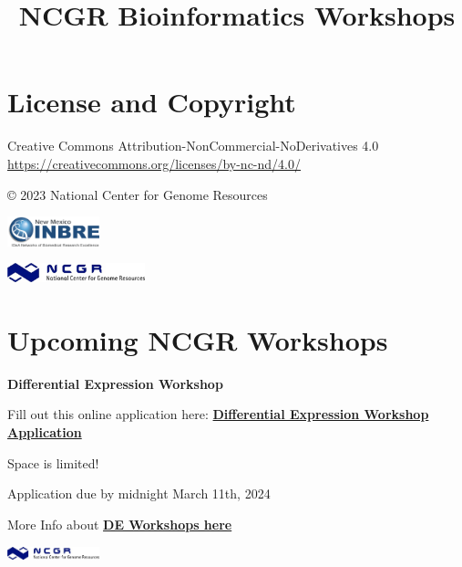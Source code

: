 \documentclass[
]{book}
\title{NCGR Bioinformatics Workshops}
\author{}
\date{\vspace{-2.5em}}
\begin{document}
\maketitle

{
\setcounter{tocdepth}{1}
\tableofcontents
}
\hypertarget{license-and-copyright}{%
\chapter*{License and Copyright}\label{license-and-copyright}}

Creative Commons Attribution-NonCommercial-NoDerivatives 4.0
\url{https://creativecommons.org/licenses/by-nc-nd/4.0/}

© 2023 National Center for Genome Resources

\includegraphics[width=0.2\textwidth,height=\textheight]{./Figures/INBRE_Logo_Grad_transparent-2019.png}

\includegraphics[width=0.3\textwidth,height=\textheight]{./Figures/ncgr.png}

\hypertarget{upcoming-ncgr-workshops}{%
\chapter*{Upcoming NCGR Workshops}\label{upcoming-ncgr-workshops}}

\textbf{Differential Expression Workshop}

Fill out this online application here:
\href{https://docs.google.com/forms/d/e/1FAIpQLScpoKxE0yAnCK3yOl5hBde7MtOWCOeXYxvjBfWyDcA9hHDGrw/viewform}{\textbf{Differential Expression Workshop Application}}

Space is limited!

Application due by midnight March 11th, 2024

More Info about \href{https://inbre.ncgr.org/ncgr-INBRE-2024/differential-expression-workshop.html\#differential-expression-workshop}{\textbf{DE Workshops here}}

\includegraphics[width=0.2\textwidth,height=\textheight]{./Figures/ncgr.png}
\end{document}
